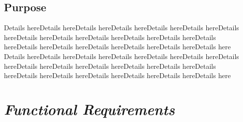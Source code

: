 \documentclass[12pt]{article}
\begin{document}
	\subsection{Purpose}
	Details hereDetails hereDetails hereDetails hereDetails hereDetails hereDetails hereDetails hereDetails hereDetails hereDetails hereDetails hereDetails hereDetails hereDetails hereDetails hereDetails hereDetails hereDetails here	Details hereDetails hereDetails hereDetails hereDetails hereDetails hereDetails hereDetails hereDetails hereDetails hereDetails hereDetails hereDetails hereDetails hereDetails hereDetails hereDetails hereDetails hereDetails here


\section{\emph{Functional Requirements}}
\end{document}
